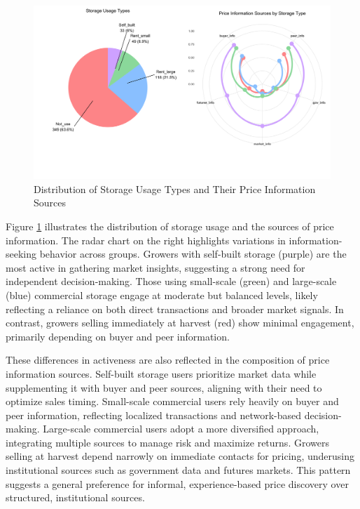 \documentclass[12pt]{article}
\begin{document}
\begin{figure}[htp]
\centering
\includegraphics[width=1\textwidth]{figures/storage_usage_analysis_soft_colors.png}
\caption{Distribution of Storage Usage Types and Their Price Information Sources}
\label{Figure: pie and radar chart}
\end{figure}

Figure \ref{Figure: pie and radar chart} illustrates the distribution of storage usage and the sources of price information. The radar chart on the right highlights variations in information-seeking behavior across groups. Growers with self-built storage (purple) are the most active in gathering market insights, suggesting a strong need for independent decision-making. Those using small-scale (green) and large-scale (blue) commercial storage engage at moderate but balanced levels, likely reflecting a reliance on both direct transactions and broader market signals. In contrast, growers selling immediately at harvest (red) show minimal engagement, primarily depending on buyer and peer information.  

These differences in activeness are also reflected in the composition of price information sources. Self-built storage users prioritize market data while supplementing it with buyer and peer sources, aligning with their need to optimize sales timing. Small-scale commercial users rely heavily on buyer and peer information, reflecting localized transactions and network-based decision-making. Large-scale commercial users adopt a more diversified approach, integrating multiple sources to manage risk and maximize returns. Growers selling at harvest depend narrowly on immediate contacts for pricing, underusing institutional sources such as government data and futures markets. This pattern suggests a general preference for informal, experience-based price discovery over structured, institutional sources.
\end{document}
